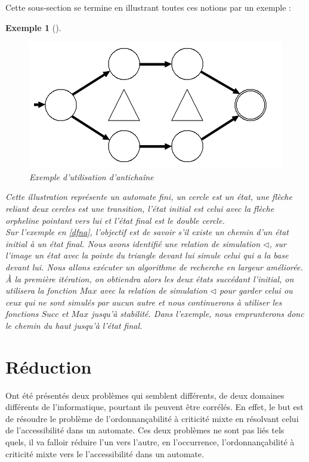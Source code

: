 \documentclass[12pt,a4paper,oneside]{book}
\theoremstyle{break}
\newtheorem{exem}{Exemple}[chapter]
\theoremstyle{breakplain}
\begin{document}
Cette sous-section se termine en illustrant toutes ces notions par un exemple :
\begin{exem}[]
\begin{figure}[!h]
\begin{center}
\includegraphics[width=\textwidth-2cm]{images/exanti2.png}
\caption{Exemple d'utilisation d'antichaîne}

\end{center}
\label{dfna}
\end{figure}

Cette illustration représente un automate fini, un cercle est un état, une flèche reliant deux cercles est une transition, l'état initial est celui avec la flèche orpheline pointant vers lui et l'état final est le double cercle.\\

Sur l'exemple en \autoref{dfna}, l'objectif est de savoir s'il existe un chemin d'un état initial à un état final. Nous avons identifié une relation de simulation $\triangleleft$, sur l'image un état avec la pointe du triangle devant lui simule celui qui a la base devant lui. Nous allons exécuter un algorithme de recherche en largeur améliorée. À la première itération, on obtiendra alors les deux états succédant l'initial, on utilisera la fonction $Max$ avec la relation de simulation $\triangleleft$ pour garder celui ou ceux qui ne sont simulés par aucun autre et nous continuerons à utiliser les fonctions $Succ$ et $Max$ jusqu'à stabilité. Dans l'exemple, nous emprunterons donc le chemin du haut jusqu'à l'état final.\\
\end{exem}

\section{Réduction}
Ont été présentés deux problèmes qui semblent différents, de deux domaines différents de l'informatique, pourtant ils peuvent être corrélés. En effet, le but est de résoudre le problème de l'ordonnançabilité à criticité mixte en résolvant celui de l'accessibilité dans un automate. Ces deux problèmes ne sont pas liés tels quels, il va falloir réduire l'un vers l'autre, en l'occurrence, l'ordonnançabilité à criticité mixte vers le l'accessibilité dans un automate.\\
\end{document}
